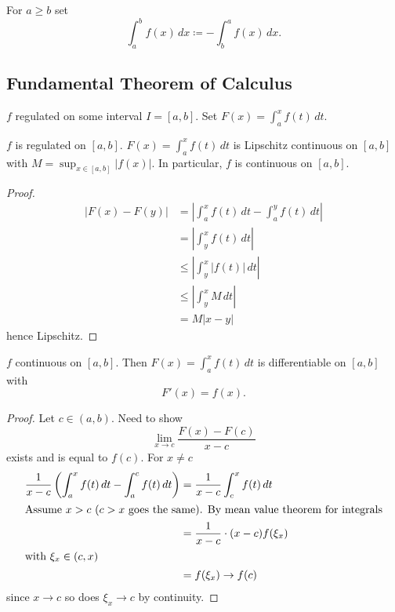\documentclass[10pt, a4paper]{article}
\begin{document}
\begin{definition}
    For $a \geq b$ set
    \[
    \int_{a}^{b}f(x)\,dx \coloneqq -\int_{b}^{a}f(x)\,dx.
    \]
\end{definition}

\subsection{Fundamental Theorem of Calculus}
$f$ regulated on some interval $I = [a, b]$.
Set $F(x) = \int_{a}^{x}f(t)\,dt$.

\begin{proposition}
    $f$ is regulated on $[a, b]$.
    $F(x) = \int_{a}^{x}f(t)\,dt$ is Lipschitz continuous on $[a, b]$ with $M = \sup_{x \in [a, b]}|f(x)|$.
    In particular,
    $f$ is continuous on $[a, b]$.

    \begin{proof}
        \begin{align*}
            |F(x) - F(y)| &= \left|\int_{a}^{x}f(t)\,dt - \int_{a}^{y}f(t)\,dt\right| \\
            &= \left|\int_{y}^{x}f(t)\,dt\right| \\
            &\leq \left|\int_{y}^{x}|f(t)|\,dt\right| \\
            &\leq \left|\int_{y}^{x}M\,dt\right| \\
            &= M|x - y|
        \end{align*}
        hence Lipschitz.
    \end{proof}
\end{proposition}

\begin{theorem}
    $f$ continuous on $[a, b]$.
    Then $F(x) = \int_{a}^{x}f(t)\,dt$ is differentiable on $[a, b]$ with
    \[
    F'(x) = f(x).
    \]

    \begin{proof}
        Let $c \in (a, b)$.
        Need to show
        \[
        \lim_{x \to c}\frac{F(x) - F(c)}{x - c}
        \]
        exists and is equal to $f(c)$.
        For $x \neq c$
        \begin{align*}
            \frac{1}{x - c}\left(\int_{a}^{x}f(t)\,dt - \int_{a}^{c}f(t)\,dt\right) &= \frac{1}{x - c}\int_{c}^{x}f(t)\,dt \\
            \intertext{Assume $x > c$
            ($c > x$ goes the same).
            By mean value theorem for integrals}
            &= \frac{1}{x - c}\cdot (x - c)f(\xi_x) \\
            \intertext{with $\xi_x \in (c, x)$}
            &= f(\xi_x) \to f(c)
        \end{align*}
        since $x \to c$ so does $\xi_x \to c$ by continuity.
    \end{proof}
\end{theorem}
\end{document}
